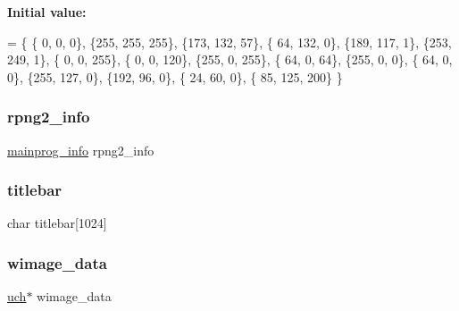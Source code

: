 {\bfseries Initial value\+:}
\begin{DoxyCode}
= \{
    \{  0,   0,   0\},    
    \{255, 255, 255\},    
    \{173, 132,  57\},    
    \{ 64, 132,   0\},    
    \{189, 117,   1\},    
    \{253, 249,   1\},    
    \{  0,   0, 255\},    
    \{  0,   0, 120\},    
    \{255,   0, 255\},    
    \{ 64,   0,  64\},    
    \{255,   0,   0\},    
    \{ 64,   0,   0\},    
    \{255, 127,   0\},    
    \{192,  96,   0\},    
    \{ 24,  60,   0\},    
    \{ 85, 125, 200\}     
\}
\end{DoxyCode}
\mbox{\label{rpng2-win_8c_a620379ebfcc5817eef3e6a063e83f64f}} 
\subsubsection{\texorpdfstring{rpng2\+\_\+info}{rpng2\_info}}
{\footnotesize\ttfamily \mbox{\hyperlink{readpng2_8h_a1b06d069c8b16f46dd13c65e745bbdcb}{mainprog\+\_\+info}} rpng2\+\_\+info\hspace{0.3cm}{\ttfamily [static]}}

\mbox{\label{rpng2-win_8c_a7d71fb2a6cfb5d27855f58bc7e548978}} 
\subsubsection{\texorpdfstring{titlebar}{titlebar}}
{\footnotesize\ttfamily char titlebar\mbox{[}1024\mbox{]}\hspace{0.3cm}{\ttfamily [static]}}

\mbox{\label{rpng2-win_8c_affd0519131c0b49596c378a425794a73}} 
\subsubsection{\texorpdfstring{wimage\+\_\+data}{wimage\_data}}
{\footnotesize\ttfamily \mbox{\hyperlink{readpng_8h_af3307af5922c72924a837559c801a8a4}{uch}}$\ast$ wimage\+\_\+data\hspace{0.3cm}{\ttfamily [static]}}

